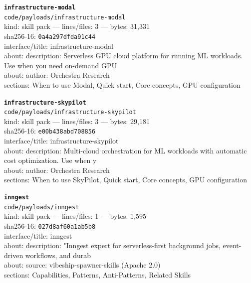 \noindent\textbf{\texttt{infrastructure-modal}}\\
\texttt{code/payloads/infrastructure-modal}\\
kind: skill pack --- lines/files: 3 --- bytes: 31,331\\
sha256-16: \texttt{0a4a297dfda91c44}\\
interface/title: infrastructure-modal\\
about: description: Serverless GPU cloud platform for running ML workloads. Use when you need on-demand GPU\\
about: author: Orchestra Research\\
sections: When to use Modal, Quick start, Core concepts, GPU configuration\\
\vspace*{6.0pt}
\newpage

\noindent\textbf{\texttt{infrastructure-skypilot}}\\
\texttt{code/payloads/infrastructure-skypilot}\\
kind: skill pack --- lines/files: 3 --- bytes: 29,181\\
sha256-16: \texttt{e00b438abd708856}\\
interface/title: infrastructure-skypilot\\
about: description: Multi-cloud orchestration for ML workloads with automatic cost optimization. Use when y\\
about: author: Orchestra Research\\
sections: When to use SkyPilot, Quick start, Core concepts, GPU configuration\\
\vspace*{6.0pt}

\noindent\textbf{\texttt{inngest}}\\
\texttt{code/payloads/inngest}\\
kind: skill pack --- lines/files: 1 --- bytes: 1,595\\
sha256-16: \texttt{027d8af60a1ab5b8}\\
interface/title: inngest\\
about: description: "Inngest expert for serverless-first background jobs, event-driven workflows, and durab\\
about: source: vibeship-spawner-skills (Apache 2.0)\\
sections: Capabilities, Patterns, Anti-Patterns, Related Skills\\
\vspace*{6.0pt}

